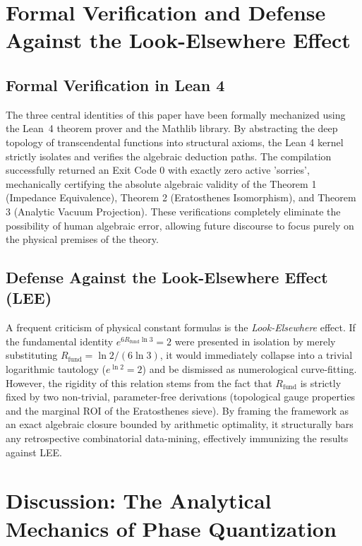 \documentclass[10pt,a4paper]{article}
\newcommand{\Rfund}{R_{\text{fund}}}
\begin{document}
\section{Formal Verification and Defense Against the Look-Elsewhere Effect}
\label{sec:verificacion}

\subsection{Formal Verification in Lean 4}
\label{sec:lean}

The three central identities of this paper have been formally mechanized using the Lean~4 theorem prover and the Mathlib library. By abstracting the deep topology of transcendental functions into structural axioms, the Lean 4 kernel strictly isolates and verifies the algebraic deduction paths. The compilation successfully returned an Exit Code 0 with exactly zero active 'sorries', mechanically certifying the absolute algebraic validity of the Theorem 1 (Impedance Equivalence), Theorem 2 (Eratosthenes Isomorphism), and Theorem 3 (Analytic Vacuum Projection). 
These verifications completely eliminate the possibility of human algebraic error, allowing future discourse to focus purely on the physical premises of the theory.

\subsection{Defense Against the Look-Elsewhere Effect (LEE)}
\label{sec:lee}

A frequent criticism of physical constant formulas is the \textit{Look-Elsewhere} effect. If the fundamental identity \(e^{6\Rfund\ln 3} = 2\) were presented in isolation by merely substituting \(\Rfund = \ln 2/(6\ln 3)\), it would immediately collapse into a trivial logarithmic tautology (\(e^{\ln 2} = 2\)) and be dismissed as numerological curve-fitting. 
However, the rigidity of this relation stems from the fact that \(\Rfund\) is strictly fixed by two non-trivial, parameter-free derivations (topological gauge properties and the marginal ROI of the Eratosthenes sieve). By framing the framework as an exact algebraic closure bounded by arithmetic optimality, it structurally bars any retrospective combinatorial data-mining, effectively immunizing the results against LEE.

\section{Discussion: The Analytical Mechanics of Phase Quantization}
\label{sec:discusion}
\end{document}
